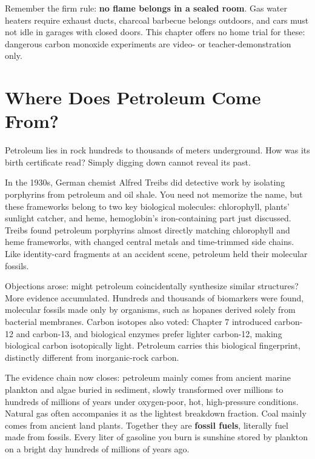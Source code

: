 Remember the firm rule: \textbf{no flame belongs in a sealed room}. Gas water heaters require exhaust ducts, charcoal barbecue belongs outdoors, and cars must not idle in garages with closed doors. This chapter offers no home trial for these: dangerous carbon monoxide experiments are video- or teacher-demonstration only.

\section{Where Does Petroleum Come From?}

\begin{zhengju}
Petroleum lies in rock hundreds to thousands of meters underground. How was its birth certificate read? Simply digging down cannot reveal its past.

In the 1930s, German chemist Alfred Treibs did detective work by isolating porphyrins from petroleum and oil shale. You need not memorize the name, but these frameworks belong to two key biological molecules: chlorophyll, plants' sunlight catcher, and heme, hemoglobin's iron-containing part just discussed. Treibs found petroleum porphyrins almost directly matching chlorophyll and heme frameworks, with changed central metals and time-trimmed side chains. Like identity-card fragments at an accident scene, petroleum held their molecular fossils.

Objections arose: might petroleum coincidentally synthesize similar structures? More evidence accumulated. Hundreds and thousands of biomarkers were found, molecular fossils made only by organisms, such as hopanes derived solely from bacterial membranes. Carbon isotopes also voted: Chapter 7 introduced carbon-12 and carbon-13, and biological enzymes prefer lighter carbon-12, making biological carbon isotopically light. Petroleum carries this biological fingerprint, distinctly different from inorganic-rock carbon.

The evidence chain now closes: petroleum mainly comes from ancient marine plankton and algae buried in sediment, slowly transformed over millions to hundreds of millions of years under oxygen-poor, hot, high-pressure conditions. Natural gas often accompanies it as the lightest breakdown fraction. Coal mainly comes from ancient land plants. Together they are \textbf{fossil fuels}, literally fuel made from fossils. Every liter of gasoline you burn is sunshine stored by plankton on a bright day hundreds of millions of years ago.
\end{zhengju}

